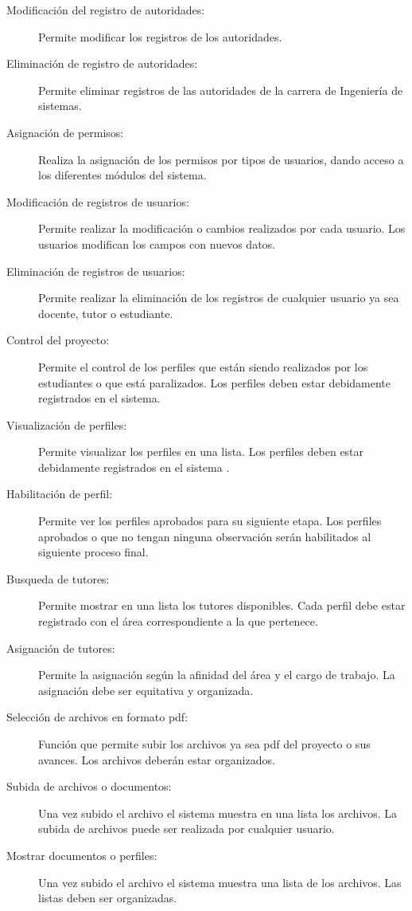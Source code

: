 \documentclass[10pt,letterpaper,twoside]{article}
\begin{document}
\begin{multicols}{2}
\begin{description}
    \item [Modificación del registro de autoridades:] Permite modificar los registros de los autoridades.
    \item [Eliminación de registro de autoridades:] Permite eliminar registros de las autoridades de la carrera de Ingeniería de sistemas.
    \item [Asignación de permisos:] Realiza la asignación de los permisos por tipos de usuarios, dando acceso a los diferentes módulos del sistema.
    \item [Modificación de registros de usuarios:] Permite realizar la modificación o cambios realizados por cada usuario. Los usuarios modifican los campos con nuevos datos.
    \item [Eliminación de registros de usuarios:] Permite realizar la eliminación de los registros de cualquier usuario ya sea docente, tutor o estudiante.
    \item [Control del proyecto:] Permite el control de los perfiles que están siendo realizados por los estudiantes o que está paralizados. Los perfiles deben estar debidamente registrados en el sistema.
    \item [Visualización de perfiles:] Permite visualizar los perfiles en una lista. Los perfiles deben estar debidamente registrados en el sistema .
    \item [Habilitación de perfil:] Permite ver los perfiles aprobados para su siguiente etapa. Los perfiles aprobados o que no tengan ninguna observación serán habilitados al siguiente proceso final.
    \item [Busqueda de tutores:] Permite mostrar en una lista los tutores disponibles. Cada perfil debe estar registrado con el área correspondiente a la que pertenece.
    \item [Asignación de tutores:] Permite la asignación según la afinidad del área y el cargo de trabajo. La asignación debe ser equitativa y organizada.
    \item [Selección de archivos en formato pdf:] Función que permite subir los archivos ya sea pdf del proyecto o sus avances. Los archivos deberán estar organizados.
    \item [Subida de archivos o documentos:] Una vez subido el archivo el sistema muestra en una lista los archivos. La subida de archivos puede ser realizada por cualquier usuario.
    \item [Mostrar documentos o perfiles:] Una vez subido el archivo el sistema muestra una lista de los archivos. Las listas deben ser organizadas.

\end{description}
\end{multicols}
\end{document}
